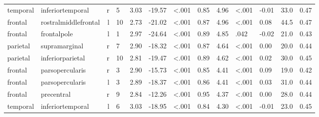 \documentclass{article}
\begin{document}
\begin{longtable}{llrR{1.5cm}R{1cm}R{1.3cm}R{1cm}R{1cm}R{1.3cm}R{1cm}R{1.8cm}R{1.3cm}R{1.8cm}}
  temporal &          inferiortemporal &    r &            5 &                  3.03 &           -19.57 &      \textless.001 &                               0.85 &                          4.96 &                   \textless.001 & -0.01 &   33.0 &      0.47 \\
   frontal &      rostralmiddlefrontal &    l &           10 &                  2.73 &           -21.02 &      \textless.001 &                               0.87 &                          4.96 &                   \textless.001 &  0.08 &   44.5 &      0.47 \\
   frontal &               frontalpole &    l &            1 &                  2.97 &           -24.64 &      \textless.001 &                               0.89 &                          4.85 &                            .042 & -0.02 &   21.0 &      0.43 \\
  parietal &             supramarginal &    r &            7 &                  2.90 &           -18.32 &      \textless.001 &                               0.87 &                          4.64 &                   \textless.001 &  0.00 &   20.0 &      0.44 \\
  parietal &          inferiorparietal &    r &           10 &                  2.81 &           -19.47 &      \textless.001 &                               0.89 &                          4.62 &                   \textless.001 &  0.02 &   30.0 &      0.45 \\
   frontal &           parsopercularis &    r &            3 &                  2.90 &           -15.73 &      \textless.001 &                               0.85 &                          4.41 &                   \textless.001 &  0.09 &   19.0 &      0.42 \\
   frontal &           parsopercularis &    l &            3 &                  2.89 &           -18.37 &      \textless.001 &                               0.86 &                          4.41 &                   \textless.001 &  0.03 &   31.0 &      0.44 \\
   frontal &                precentral &    r &            9 &                  2.84 &           -12.26 &      \textless.001 &                               0.95 &                          4.37 &                   \textless.001 &  0.00 &   28.0 &      0.44 \\
  temporal &          inferiortemporal &    l &            6 &                  3.03 &           -18.95 &      \textless.001 &                               0.84 &                          4.30 &                   \textless.001 & -0.01 &   23.0 &      0.45 \\

\end{longtable}
\end{document}
